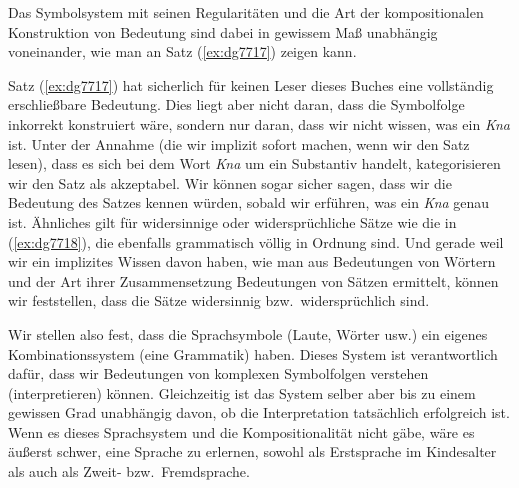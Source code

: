 Das Symbolsystem mit seinen Regularitäten und die Art der kompositionalen Konstruktion von Bedeutung sind dabei in gewissem Maß unabhängig voneinander, wie man an Satz (\ref{ex:dg7717}) zeigen kann.

\begin{exe}
\end{exe}

Satz (\ref{ex:dg7717}) hat sicherlich für keinen Leser dieses Buches eine vollständig er\-schließ\-bare Bedeutung.
Dies liegt aber nicht daran, dass die Symbolfolge inkorrekt konstruiert wäre, sondern nur daran, dass wir nicht wissen, was ein \textit{Kna} ist.
Unter der Annahme (die wir implizit sofort machen, wenn wir den Satz lesen), dass es sich bei dem Wort \textit{Kna} um ein Substantiv handelt, kategorisieren wir den Satz als akzeptabel.
Wir können sogar sicher sagen, dass wir die Bedeutung des Satzes kennen würden, sobald wir erführen, was ein \textit{Kna} genau ist.
Ähnliches gilt für widersinnige oder widersprüchliche Sätze wie die in (\ref{ex:dg7718}), die ebenfalls grammatisch völlig in Ordnung sind.
Und gerade weil wir ein implizites Wissen davon haben, wie man aus Bedeutungen von Wörtern und der Art ihrer Zusammensetzung Bedeutungen von Sätzen ermittelt, können wir feststellen, dass die Sätze widersinnig bzw.\ widersprüchlich sind.

\begin{exe}
  \ex\label{ex:dg7718}
  \begin{xlist}
  \end{xlist}
\end{exe}

Wir stellen also fest, dass die Sprachsymbole (Laute, Wörter usw.) ein eigenes Kombinationssystem (eine Grammatik) haben.
Dieses System ist verantwortlich dafür, dass wir Bedeutungen von komplexen Symbolfolgen verstehen (interpretieren) können.
Gleichzeitig ist das System selber aber bis zu einem gewissen Grad unabhängig davon, ob die Interpretation tatsächlich erfolgreich ist.
Wenn es dieses Sprachsystem und die Kompositionalität nicht gäbe, wäre es äußerst schwer, eine Sprache zu erlernen, sowohl als Erstsprache im Kindesalter als auch als Zweit- bzw.\ Fremdsprache.

